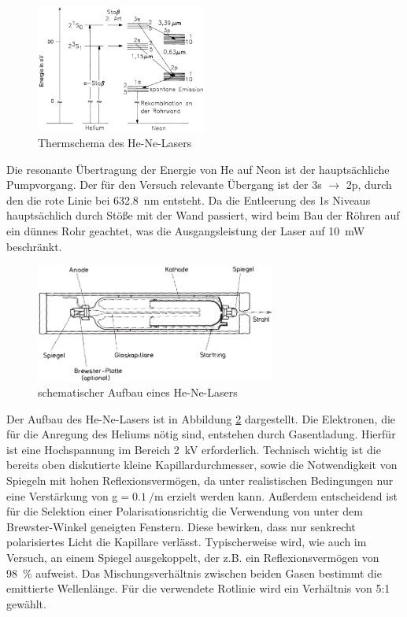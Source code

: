\documentclass[a4paper,twoside,final]{article}
\begin{document}
\begin{figure}[htp]
  \centering
  \includegraphics[width=0.5\textwidth]{Bilder/HeNe-Termschema.pdf}
  \caption{Thermschema des He-Ne-Lasers}
  \label{fig:Termschema}
\end{figure}

Die resonante Übertragung der Energie von He auf Neon ist der hauptsächliche Pumpvorgang. Der für den Versuch relevante Übergang ist der 3s $\rightarrow$ 2p, durch den die rote Linie bei \SI{632,8}{\nano\meter} entsteht. Da die Entleerung des 1s Niveaus hauptsächlich durch Stöße mit der Wand passiert, wird beim Bau der Röhren auf ein dünnes Rohr geachtet, was die Ausgangsleistung der Laser auf \SI{10}{\milli\watt} beschränkt.

\begin{figure}[htp]
  \centering
  \includegraphics[width=0.7\textwidth]{Bilder/HeNe-Laser_Aufbau.pdf}
  \caption{schematischer Aufbau eines He-Ne-Lasers}
  \label{fig:Aufbau}
\end{figure}

Der Aufbau des He-Ne-Lasers ist in Abbildung \ref{fig:Aufbau} dargestellt. Die Elektronen, die für die Anregung des Heliums nötig sind, entstehen durch Gasentladung. Hierfür ist eine Hochspannung im Bereich \SI{2}{\kilo\volt} erforderlich. Technisch wichtig ist die bereits oben diskutierte kleine Kapillardurchmesser, sowie die Notwendigkeit von Spiegeln mit hohen Reflexionsvermögen, da unter realistischen Bedingungen nur eine Verstärkung von g$=\SI{0,1}{\per\meter}$ erzielt werden kann. Außerdem entscheidend ist für die Selektion einer Polarisationsrichtig die Verwendung von unter dem Brewster-Winkel geneigten Fenstern. Diese bewirken, dass nur senkrecht polarisiertes Licht die Kapillare verlässt. Typischerweise wird, wie auch im Versuch, an einem Spiegel ausgekoppelt, der z.B. ein Reflexionsvermögen von \SI{98}{\percent} aufweist. Das Mischungsverhältnis zwischen beiden Gasen bestimmt die emittierte Wellenlänge. Für die verwendete Rotlinie wird ein Verhältnis von 5:1 gewählt.
\end{document}
